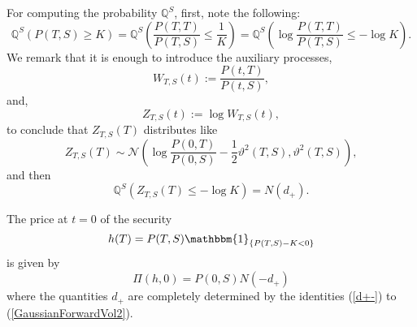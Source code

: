 \begin{demo}
For computing the probability $\mathbb{Q}^S$, first, note the following:
$$
\mathbb{Q}^S(P(T,S)\geq K)=\mathbb{Q}^S\left(\frac{P(T,T)}{P(T,S)}\leq
  \frac{1}{K}\right) =\mathbb{Q}^S\left(\log\frac{P(T,T)}{P(T,S)}\leq
  -\log K\right).$$
We remark that it is enough to introduce the auxiliary processes,
$$
W_{T,S}(t):=\frac{P(t,T)}{P(t,S)},
$$
and,
$$
Z_{T,S}(t):=\log W_{T,S}(t),
$$
to conclude that $Z_{T,S}(T)$ distributes like
$$
Z_{T,S}(T) \sim\mathcal{N}\left( \log \frac{P(0,T)}{P(0,S)}-\frac{1}{2}\vartheta^2(T,S), \vartheta^2(T,S)\right),
$$
and then
$$
\mathbb{Q}^S(Z_{T,S}(T)\leq -\log K)=N(d_+).
$$
\end{demo}
\begin{lema}
The price at $t=0$ of the security 
$$
h(T)=P(T,S) \mathbbm{1}_{ \{ P(T,S)-K < 0 \} }
$$
is given by
\begin{equation}
\Pi(h,0)=P(0,S) N(-d_+)
\end{equation}
where the quantities $d_+$ are completely determined by the
identities (\ref{d+-}) to (\ref{GaussianForwardVol2}).  
\end{lema}
